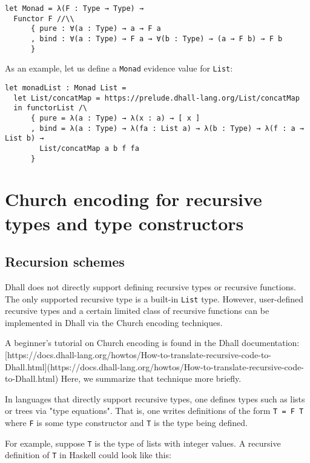 \begin{lstlisting}[language=Dhall]
let Monad = λ(F : Type → Type) →
  Functor F //\\
      { pure : ∀(a : Type) → a → F a
      , bind : ∀(a : Type) → F a → ∀(b : Type) → (a → F b) → F b
      }
\end{lstlisting}


As an example, let us define a \lstinline!Monad! evidence value for \lstinline!List!:


\begin{lstlisting}[language=Dhall]
let monadList : Monad List =
  let List/concatMap = https://prelude.dhall-lang.org/List/concatMap
  in functorList /\
      { pure = λ(a : Type) → λ(x : a) → [ x ]
      , bind = λ(a : Type) → λ(fa : List a) → λ(b : Type) → λ(f : a → List b) →
        List/concatMap a b f fa
      }
\end{lstlisting}


\section{Church encoding for recursive types and type constructors}


\subsection{Recursion schemes}


Dhall does not directly support defining recursive types or recursive functions.
The only supported recursive type is a built-in \lstinline!List! type. 
However, user-defined recursive types and a certain limited class of recursive functions can be implemented in Dhall via the Church encoding techniques. 


A beginner's tutorial on Church encoding is found in the Dhall documentation: [https://docs.dhall-lang.org/howtos/How-to-translate-recursive-code-to-Dhall.html](https://docs.dhall-lang.org/howtos/How-to-translate-recursive-code-to-Dhall.html)
Here, we summarize that technique more briefly.


In languages that directly support recursive types, one defines types such as lists or trees via "type equations".
That is, one writes definitions of the form \lstinline!T = F T! where \lstinline!F! is some type constructor and \lstinline!T! is the type being defined.


For example, suppose \lstinline!T! is the type of lists with integer values.
A recursive definition of \lstinline!T! in Haskell could look like this:


